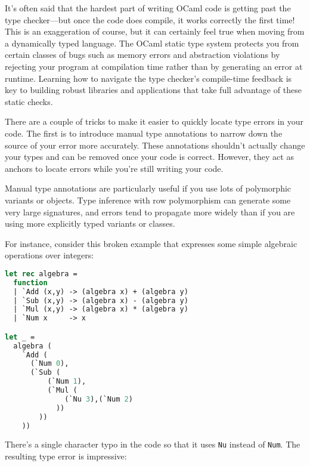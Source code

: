 It's often said that the hardest part of writing OCaml code is getting
past the type checker---but once the code does compile, it works
correctly the first time! This is an exaggeration of course, but it can
certainly feel true when moving from a dynamically typed language. The
OCaml static type system protects you from certain classes of bugs such
as memory errors and abstraction violations by rejecting your program at
compilation time rather than by generating an error at runtime. Learning
how to navigate the type checker's compile-time feedback is key to
building robust libraries and applications that take full advantage of
these static checks.

There are a couple of tricks to make it easier to quickly locate type
errors in your code. The first is to introduce manual type annotations
to narrow down the source of your error more accurately. These
annotations shouldn't actually change your types and can be removed once
your code is correct. However, they act as anchors to locate errors
while you're still writing your code.

Manual type annotations are particularly useful if you use lots of
polymorphic variants or objects. Type inference with row polymorphism
can generate some very large signatures, and errors tend to propagate
more widely than if you are using more explicitly typed variants or
classes.

For instance, consider this broken example that expresses some simple
algebraic operations over integers:

\begin{lstlisting}[language=Caml]
let rec algebra =
  function
  | `Add (x,y) -> (algebra x) + (algebra y)
  | `Sub (x,y) -> (algebra x) - (algebra y)
  | `Mul (x,y) -> (algebra x) * (algebra y)
  | `Num x     -> x

let _ =
  algebra (
    `Add (
      (`Num 0),
      (`Sub (
          (`Num 1),
          (`Mul (
              (`Nu 3),(`Num 2)
            ))
        ))
    ))
\end{lstlisting}

There's a single character typo in the code so that it uses
\passthrough{\lstinline!Nu!} instead of \passthrough{\lstinline!Num!}.
The resulting type error is impressive:

